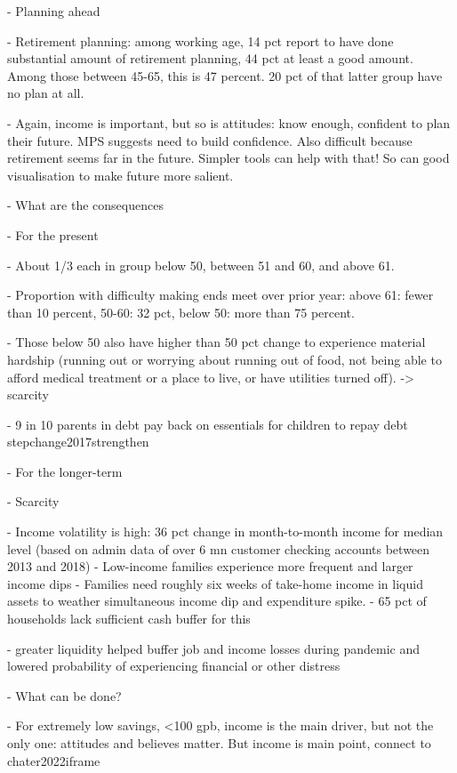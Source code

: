- Planning ahead

- Retirement planning: among working age, 14 pct report to have done
substantial amount of retirement planning, 44 pct at least a good amount. Among
those between 45-65, this is 47 percent. 20 pct of that latter group have no
plan at all. 

- Again, income is important, but so is attitudes: know enough, confident to
plan their future. MPS suggests need to build confidence. Also difficult
because retirement seems far in the future.  Simpler tools can
help with that! So can good visualisation to make future more salient. 




- What are the consequences

- For the present

\citet{cfpb2017financial}

- About 1/3 each in group below 50, between 51 and 60, and above 61.

- Proportion with difficulty making ends meet over prior year: above 61: fewer
than 10 percent, 50-60: 32 pct, below 50: more than 75 percent.

- Those below 50 also have higher than 50 pct change to experience 
material hardship (running out or worrying about running out of food, not being
able to afford medical treatment or a place to live, or have utilities turned
off). -> scarcity 


- 9 in 10 parents in debt pay back on essentials for children to repay debt
stepchange2017strengthen


- For the longer-term

- Scarcity

\citet{jpmorgan2019weathering}
- Income volatility is high: 36 pct change in month-to-month income for median
level (based on admin data of over 6 mn customer checking accounts between 2013
and 2018)
- Low-income families experience more frequent and larger income dips
- Families need roughly six weeks of take-home income in liquid assets to
weather simultaneous income dip and expenditure spike.
- 65 pct of households lack sufficient cash buffer for this

\citet{roll2020income}
- greater liquidity helped buffer job and income losses during pandemic and
lowered probability of experiencing financial or other distress






- What can be done?

- For extremely low savings, <100 gpb, income is the main driver, but not the
only one: attitudes and believes matter. But income is main point, connect to
chater2022iframe

